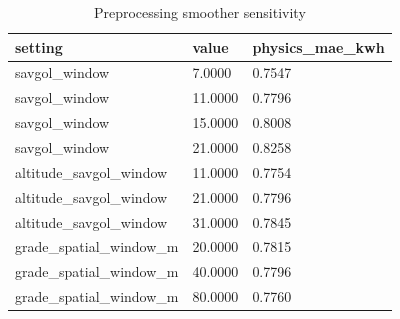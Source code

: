 \begin{table}[t]
\centering
\caption{Preprocessing smoother sensitivity}
\label{tab:presens}
\begin{tabular}{lll}
\hline
setting & value & physics\_mae\_kwh \\
\hline
savgol\_window & 7.0000 & 0.7547 \\
savgol\_window & 11.0000 & 0.7796 \\
savgol\_window & 15.0000 & 0.8008 \\
savgol\_window & 21.0000 & 0.8258 \\
altitude\_savgol\_window & 11.0000 & 0.7754 \\
altitude\_savgol\_window & 21.0000 & 0.7796 \\
altitude\_savgol\_window & 31.0000 & 0.7845 \\
grade\_spatial\_window\_m & 20.0000 & 0.7815 \\
grade\_spatial\_window\_m & 40.0000 & 0.7796 \\
grade\_spatial\_window\_m & 80.0000 & 0.7760 \\
\hline
\end{tabular}
\end{table}
